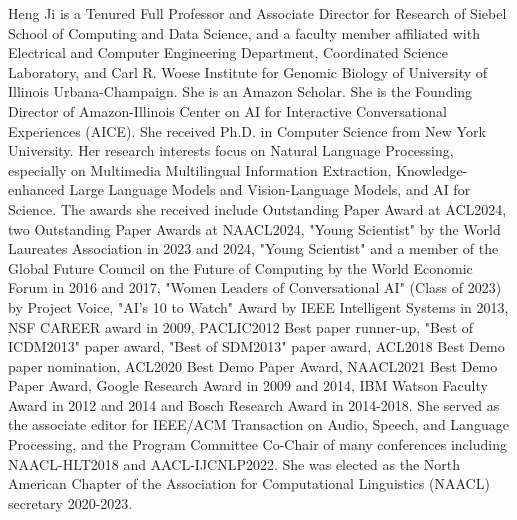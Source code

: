 Heng Ji is a Tenured Full Professor and Associate Director for Research of Siebel School of Computing and Data Science, and a faculty member affiliated with Electrical and Computer Engineering Department, Coordinated Science Laboratory, and Carl R. Woese Institute for Genomic Biology of University of Illinois Urbana-Champaign. She is an Amazon Scholar. She is the Founding Director of Amazon-Illinois Center on AI for Interactive Conversational Experiences (AICE). She received Ph.D. in Computer Science from New York University. Her research interests focus on Natural Language Processing, especially on Multimedia Multilingual Information Extraction, Knowledge-enhanced Large Language Models and Vision-Language Models, and AI for Science. The awards she received include Outstanding Paper Award at ACL2024, two Outstanding Paper Awards at NAACL2024, "Young Scientist" by the World Laureates Association in 2023 and 2024, "Young Scientist" and a member of the Global Future Council on the Future of Computing by the World Economic Forum in 2016 and 2017, "Women Leaders of Conversational AI" (Class of 2023) by Project Voice, "AI's 10 to Watch" Award by IEEE Intelligent Systems in 2013, NSF CAREER award in 2009, PACLIC2012 Best paper runner-up, "Best of ICDM2013" paper award, "Best of SDM2013" paper award, ACL2018 Best Demo paper nomination, ACL2020 Best Demo Paper Award, NAACL2021 Best Demo Paper Award, Google Research Award in 2009 and 2014, IBM Watson Faculty Award in 2012 and 2014 and Bosch Research Award in 2014-2018. She served as the associate editor for IEEE/ACM Transaction on Audio, Speech, and Language Processing, and the Program Committee Co-Chair of many conferences including NAACL-HLT2018 and AACL-IJCNLP2022. She was elected as the North American Chapter of the Association for Computational Linguistics (NAACL) secretary 2020-2023.
